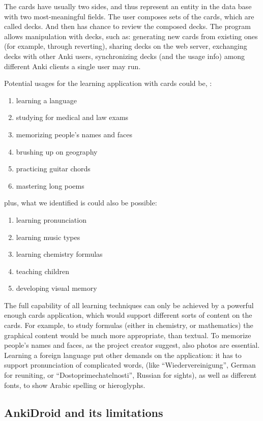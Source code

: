 \documentclass[a4paper,11pt,twoside]{article}
\begin{document}
The cards have usually two sides, and thus represent an entity in the data base with two most-meaningful fields. The
user composes sets of the cards, which are called decks. And then has chance to review the composed decks. The program
allows manipulation with decks, such as: generating new cards from existing ones (for example, through reverting),
sharing decks on the web server, exchanging decks with other Anki users, synchronizing decks (and the usage info) among 
different Anki clients a single user may run.


Potential usages for the learning application with cards could be, \citet{ankinet}:
\begin{enumerate}
  \item learning a language
  \item studying for medical and law exams
  \item memorizing people's names and faces
  \item brushing up on geography
  \item practicing guitar chords
  \item mastering long poems  
\end{enumerate}
plus, what we identified is could also be possible:
\begin{enumerate}
  \item learning pronunciation
  \item learning music types 
  \item learning chemistry formulas
  \item teaching children
  \item developing visual memory
\end{enumerate}

The full capability of all learning techniques can only be achieved by a powerful enough cards
application, which would support different sorts of content on the cards. For example, to study formulas
(either in chemistry, or mathematics) the graphical content would be much more appropriate, than textual.
To memorize people's names and faces, as the project creator suggest, also photos are essential. Learning
a foreign language put other demands on the application: it has to support pronunciation of complicated words,
(like ``Wiedervereinigung'', German for reuniting, or 
``Dostoprimechatelnosti'', Russian for sights), as well 
as different fonts, to show Arabic spelling or hieroglyphs.

\subsection{AnkiDroid and its limitations}
\end{document}
